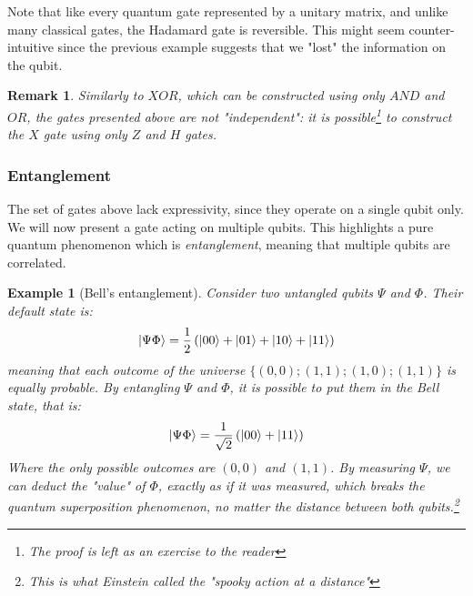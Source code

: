 \documentclass[12pt,a4paper]{article}
\theoremstyle{plain}
\newtheorem*{example}{Example}
\newtheorem*{remark}{Remark}
\theoremstyle{definition}
\DeclarePairedDelimiter\ket{\lvert}{\rangle}
\begin{document}
Note that like every quantum gate represented by a unitary matrix, and unlike many classical gates, the Hadamard gate is reversible. This might seem counter-intuitive since the previous example suggests that we "lost" the information on the qubit. 

\begin{remark}
    Similarly to $XOR$, which can be constructed using only $AND$ and $OR$, the gates presented above are not "independent": it is possible\footnote{The proof is left as an exercise to the reader} to construct the $X$ gate using only $Z$ and $H$ gates.
\end{remark}

\subsubsection{Entanglement}
The set of gates above lack expressivity, since they operate on a single qubit only. We will now present a gate acting on multiple qubits. This highlights a pure quantum phenomenon which is \emph{entanglement}, meaning that multiple qubits are correlated.

\begin{example}[Bell's entanglement]
    Consider two untangled qubits $\Psi$ and $\Phi$. Their default state is:
    \begin{equation*}
        \ket{\Psi\Phi} = \frac{1}{2} \left(\ket{00}+\ket{01}+\ket{10}+\ket{11}\right)
    \end{equation*}
    meaning that each outcome of the universe $\{(0,0); (1,1); (1,0); (1,1)\}$ is equally probable. By entangling $\Psi$ and $\Phi$, it is possible to put them in the \emph{Bell state}, that is: 
    \begin{equation*}
        \ket{\Psi\Phi} = \frac{1}{\sqrt{2}} \left(\ket{00}+\ket{11}\right)
    \end{equation*}
    Where the only possible outcomes are $(0, 0)$ and $(1, 1)$. By measuring $\Psi$, we can deduct the "value" of $\Phi$, exactly as if it was measured, which breaks the quantum superposition phenomenon, no matter the distance between both qubits.\footnote{This is what Einstein called the "spooky action at a distance"}
\end{example}
\end{document}
